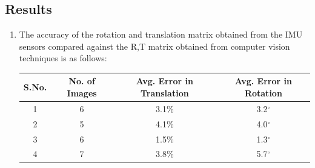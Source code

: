 \documentclass{article}
\begin{document}
		\subsection{Results}
			\begin{enumerate}
				\item The accuracy of the rotation and translation matrix obtained from the IMU sensors compared against the R,T matrix obtained from computer vision techniques is as follows:
	\\ 					\begin{tabular}{|c | c | c | c |}
 						\hline
 						S.No. & No. of Images & Avg. Error in Translation & Avg. Error in Rotation \\ \hline
 						1 & 6 & 3.1\% & 3.2$^{\circ}$ \\ \hline
 						2 & 5 & 4.1\% & 4.0$^{\circ}$ \\ \hline
 						3 & 6 & 1.5\% & 1.3$^{\circ}$ \\ \hline
 						4 & 7 & 3.8\% & 5.7$^{\circ}$ \\ \hline


\end{tabular}
\end{enumerate}
\end{document}
